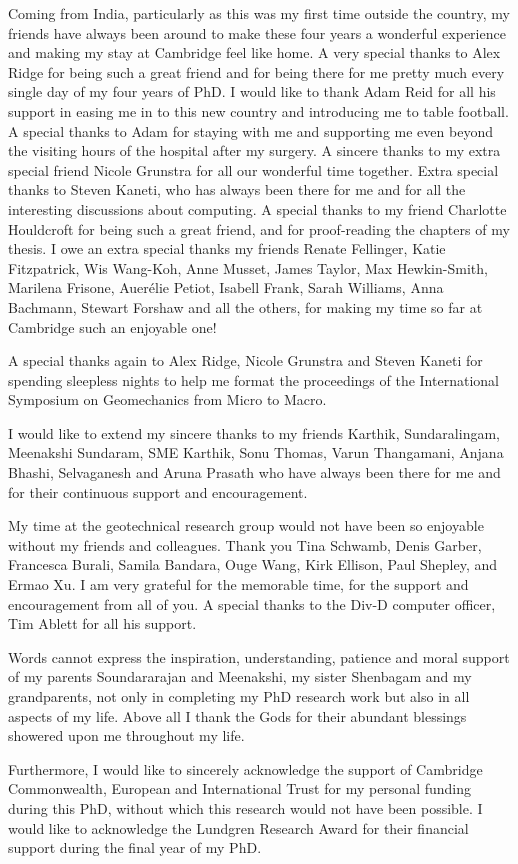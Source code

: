 \begin{acknowledgements}
Coming from India, particularly as this was my first time outside the country, 
my friends have always been around to make these four years a wonderful 
experience and making my stay at Cambridge feel like home. A very special 
thanks to Alex Ridge for being such a great friend 
and for being there for me pretty much every single day of my four years of 
PhD. I would like to thank Adam Reid for all his support in easing me in to 
this new country and introducing me to table football. A special thanks to Adam 
for staying with me and supporting me even beyond the visiting hours of the 
hospital after my surgery. A sincere thanks to my extra special friend Nicole 
Grunstra for all our wonderful time together. Extra special thanks to Steven 
Kaneti, who has always been there for me and for all the interesting 
discussions about computing. A special thanks to my friend Charlotte Houldcroft 
for being such a great friend, and for proof-reading the chapters of my thesis. 
I owe an extra special thanks my friends Renate Fellinger, Katie Fitzpatrick, 
Wis Wang-Koh, Anne Musset, James Taylor, Max Hewkin-Smith, Marilena Frisone, 
Auer\'{e}lie Petiot, Isabell Frank, Sarah Williams, Anna Bachmann, Stewart 
Forshaw and all the others, for making my time so far at Cambridge such an 
enjoyable one!

A special thanks again to Alex Ridge, Nicole Grunstra and Steven Kaneti for 
spending sleepless nights to help me format the proceedings of the 
International Symposium on Geomechanics from Micro to Macro. 

I would like to extend my sincere thanks to my friends Karthik, 
Sundaralingam, Meenakshi Sundaram, SME Karthik, Sonu Thomas, Varun Thangamani, 
Anjana Bhashi,  Selvaganesh and Aruna Prasath who have always been there for 
me and for their continuous support and encouragement.

My time at the geotechnical research group would not have been so enjoyable 
without my friends and colleagues. Thank you Tina Schwamb, Denis Garber,
Francesca Burali, Samila Bandara, Ouge Wang, Kirk Ellison, Paul 
Shepley, and Ermao Xu. I am very grateful for the memorable time, 
for the support and encouragement from all of you. A special thanks to the 
Div-D computer officer, Tim Ablett for all his support.

Words cannot express the inspiration, understanding, patience and moral support 
of my parents Soundararajan and Meenakshi, my sister Shenbagam and my 
grandparents, not only in completing my PhD research work but also in all 
aspects of my life. Above all I thank the Gods for their abundant blessings 
showered upon me throughout my life.

Furthermore, I would like to sincerely acknowledge the support of Cambridge 
Commonwealth, European and International Trust for my personal funding during 
this PhD, without which this research would not have been possible. I would 
like to acknowledge the Lundgren Research Award for their financial support 
during the final year of my PhD.

\end{acknowledgements}

